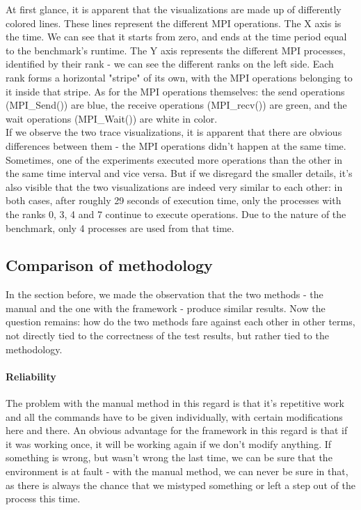 At first glance, it is apparent that the visualizations are made up of
differently colored lines. These lines represent the different MPI
operations. The X axis is the time. We can see that it starts from
zero, and ends at the time period equal to the benchmark's
runtime. The Y axis represents the different MPI processes, identified
by their rank - we can see the different ranks on the left side. Each
rank forms a horizontal "stripe" of its own, with the MPI operations
belonging to it inside that stripe. As for the MPI operations
themselves: the send operations (MPI\_Send()) are blue, the receive
operations (MPI\_recv()) are green, and the wait operations
(MPI\_Wait()) are white in color.\\
If we observe the two trace visualizations, it is apparent that there
are obvious differences between them - the MPI operations didn't
happen at the same time. Sometimes, one of the experiments executed
more operations than the other in the same time interval and vice
versa. But if we disregard the smaller details, it's also visible that
the two visualizations are indeed very similar to each other: in both
cases, after roughly 29 seconds of execution time, only the processes
with the ranks 0, 3, 4 and 7 continue to execute operations. Due to
the nature of the benchmark, only 4 processes are used from that time.
\subsection{Comparison of methodology}
In the section before, we made the observation that the two methods -
the manual and the one with the framework - produce similar
results. Now the question remains: how do the two methods fare against
each other in other terms, not directly tied to the correctness of the
test results, but rather tied to the methodology.
\paragraph{Reliability}
The problem with the manual method in this regard is that it's
repetitive work and all the commands have to be given individually,
with certain modifications here and there. An obvious advantage for
the framework in this regard is that if it was working once, it will
be working again if we don't modify anything. If something is wrong,
but wasn't wrong the last time, we can be sure that the environment is
at fault - with the manual method, we can never be sure in that, as
there is always the chance that we mistyped something or left a step
out of the process this time.
